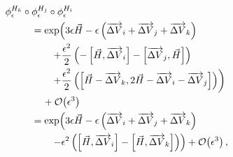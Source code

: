 \documentclass{article}
\begin{document}
\begin{align*}
\phi^{H_{k}}_{\epsilon} \circ \phi^{H_{j}}_{\epsilon} \circ \phi^{H_{i}}_{\epsilon}
&
\\
& \hspace{-15mm} =
\exp \! \left( 
3 \epsilon \vec{H} 
- \epsilon \left( \overrightarrow{ \Delta V}_{i} +  \overrightarrow{ \Delta V}_{j} +  \overrightarrow{ \Delta V}_{k} \right)
\right.
\\
& \hspace{-8mm} \left.
+ \frac{\epsilon^{2}}{2} \left(
- \left[ \vec{H}, \overrightarrow{ \Delta V}_{i} \right]
- \left[ \overrightarrow{ \Delta V}_{j}, \vec{H} \right] \right) \right.
\\
& \hspace{-8mm} \left.
+ \frac{\epsilon^{2}}{2} \left(
\left[ \vec{H} - \overrightarrow{ \Delta V}_{k}, 2 \vec{H} - \overrightarrow{ \Delta V}_{i} - \overrightarrow{ \Delta V}_{j} \right]
\right)
\right)
\\
& \hspace{-11mm} + \mathcal{O} \! \left( \epsilon^{3} \right)
\\
& \hspace{-15mm} =
\exp \! \left( 
3 \epsilon \vec{H} 
- \epsilon \left( \overrightarrow{ \Delta V}_{i} + \overrightarrow{ \Delta V}_{j} + \overrightarrow{ \Delta V}_{k} \right)
\right.
\\
& \hspace{-8mm} \left.
- \epsilon^{2} \left( \left[ \vec{H}, \overrightarrow{ \Delta V}_{i} \right] 
- \left[ \vec{H}, \overrightarrow{ \Delta V}_{k} \right] \right)
\right) + \mathcal{O} \! \left( \epsilon^{3} \right),
\end{align*}
\end{document}
